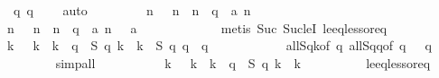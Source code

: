 \begin{isabellebody}
\ {\isacharbackquoteopen}{}\ {\isasymle}\ {\isacharquery}q{\isacharbackquoteclose}\ {\isacharbackquoteopen}{\isacharquery}q\ {\isasymle}\ {}{}{}{}{\isacharbackquoteclose}\ \isamarkupfalse%
\ auto\isanewline
\ \ \ \ \ \ \isamarkupfalse%
\ {\isachardoublequoteopen}{\isasymforall}\ n{\isachardot}\ {}\ {\isasymle}\ n\ {\isasymand}\ n\ {\isacharless}\ q\ {\isasymlongrightarrow}\ a\ n\ {\isacharequal}\ {}{\isachardoublequoteclose}\isanewline
\ \ \ \ \ \ \ \ \isamarkupfalse%
\ {\isacharbackquoteopen}{\isasymforall}\ n{\isachardot}\ {}\ {\isasymle}\ n\ {\isasymand}\ n\ {\isacharless}\ {\isacharquery}q\ {\isasymlongrightarrow}\ a\ n\ {\isacharequal}\ {}{\isacharbackquoteclose}\ {\isacharbackquoteopen}a\ {}\ {\isacharequal}\ {}{\isacharbackquoteclose}\isanewline
\ \ \ \ \ \ \ \ \isamarkupfalse%
\ {\isacharparenleft}metis\ Suc{\isacharunderscore}{}\ Suc{\isacharunderscore}leI\ le{\isacharunderscore}eq{\isacharunderscore}less{\isacharunderscore}or{\isacharunderscore}eq{\isacharparenright}\isanewline
\ \ \ \ \ \ \isamarkupfalse%
\ \isamarkupfalse%
\ {\isachardoublequoteopen}{\isasymforall}\ k{\isachardot}\ {}\ {\isasymle}\ k\ {\isasymand}\ k\ {\isacharless}\ q\ {\isasymlongrightarrow}\ {\isacharquery}S\ q\ k\ {\isacharequal}\ k{\isachardoublequoteclose}\ \ {\isachardoublequoteopen}{\isacharquery}S\ q\ q\ {\isacharequal}\ q\ {\isacharminus}\ {}{\isachardoublequoteclose}\isanewline
\ \ \ \ \ \ \ \ \isamarkupfalse%
\ all{\isacharunderscore}{}{\isacharunderscore}Sqk{\isacharbrackleft}of\ q{\isacharbrackright}\ all{\isacharunderscore}{}{\isacharunderscore}Sqq{\isacharbrackleft}of\ q{\isacharbrackright}\ {\isacharbackquoteopen}{}\ {\isasymle}\ q{\isacharbackquoteclose}\isanewline
\ \ \ \ \ \ \ \ \isamarkupfalse%
\ simp{\isacharunderscore}all\isanewline
\ \ \ \ \ \ \isamarkupfalse%
\ \isamarkupfalse%
\ {\isachardoublequoteopen}{\isasymforall}\ k{\isachardot}\ {}\ {\isasymle}\ k\ {\isasymand}\ k\ {\isasymle}\ q\ {\isasymlongrightarrow}\ {\isacharquery}S\ q\ k\ {\isasymle}\ k{\isachardoublequoteclose}\isanewline
\ \ \ \ \ \ \ \ \isamarkupfalse%
\ le{\isacharunderscore}eq{\isacharunderscore}less{\isacharunderscore}or{\isacharunderscore}eq\isanewline
\ \ \ \ \ \ \ \ \isamarkupfalse%

\end{isabellebody}
